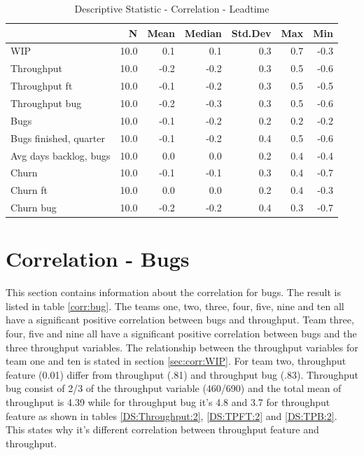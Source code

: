 \documentclass[UKenglish]{ifimaster}  %
\begin{document}
\begin{table}[!htbp]
 \centering
 \begin{tabular}{ | l | r | r | r | r | r | r | }
 \hline
 & N & Mean & Median & Std.Dev & Max & Min \\ \hline
 
WIP  & 10.0 & 0.1 & 0.1 & 0.3 & 0.7 & -0.3\\ \hline
Throughput  & 10.0 & -0.2 & -0.2 & 0.3 & 0.5 & -0.6\\ \hline
Throughput ft  & 10.0 & -0.1 & -0.2 & 0.3 & 0.5 & -0.5\\ \hline
Throughput bug  & 10.0 & -0.2 & -0.3 & 0.3 & 0.5 & -0.6\\ \hline
Bugs  & 10.0 & -0.1 & -0.2 & 0.2 & 0.2 & -0.2\\ \hline
Bugs finished, quarter  & 10.0 & -0.1 & -0.2 & 0.4 & 0.5 & -0.6\\ \hline
Avg days backlog, bugs  & 10.0 & 0.0 & 0.0 & 0.2 & 0.4 & -0.4\\ \hline
Churn  & 10.0 & -0.1 & -0.1 & 0.3 & 0.4 & -0.7\\ \hline
Churn ft  & 10.0 & 0.0 & 0.0 & 0.2 & 0.4 & -0.3\\ \hline
Churn bug  & 10.0 & -0.2 & -0.2 & 0.4 & 0.3 & -0.7\\ \hline
\end{tabular}
 \caption{Descriptive Statistic - Correlation - Leadtime}
 \label{DS:corr:LT}
 \end{table}


\section{Correlation - Bugs}
\label{sec:corr:bug}

This section contains information about the correlation for bugs. The result is listed in table \ref{corr:bug}. The teams one, two, three, four, five, nine and ten all have a significant positive correlation between bugs and throughput. Team three, four, five and nine all have a significant positive correlation between bugs and the three throughput variables. The relationship between the throughput variables for team one and ten is stated in section \ref{sec:corr:WIP}. For team two, throughput feature (0.01) differ from throughput (.81) and throughput bug (.83).   Throughput bug consist of 2/3 of the throughput variable (460/690) and the total mean of throughput is 4.39 while for throughput bug it's 4.8 and 3.7 for throughput feature as shown in tables \ref{DS:Throughput:2}, \ref{DS:TPFT:2} and \ref{DS:TPB:2}. This states why it's different correlation between throughput feature and throughput. 
\end{document}

